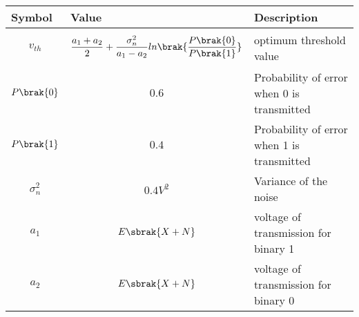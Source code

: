 \begin{tabular}{|p{1cm}|p{3.80cm}|p{2.70cm}|}
    \hline
    Symbol&Value&Description\\ \hline
    $$v_{th}$$&$$\frac{a_1+a_2}{2}+\frac{\sigma_{n}^{2}}{a_1-a_2}ln\brak{\frac{P\brak{0}}{P\brak{1}}}$$&optimum threshold value\\\hline
    $$P\brak{0}$$&$$0.6$$&Probability of error when 0 is transmitted\\\hline
    $$P\brak{1}$$&$$0.4$$&Probability of error when 1 is transmitted\\\hline
    $$\sigma_{n}^{2}$$&$$0.4V^2$$&Variance of the noise\\\hline
    $$a_1$$&$$E\sbrak{X+N}$$&voltage of transmission for binary 1\\\hline
    $$a_2$$&$$E\sbrak{X+N}$$&voltage of transmission for binary 0\\\hline
\end{tabular}